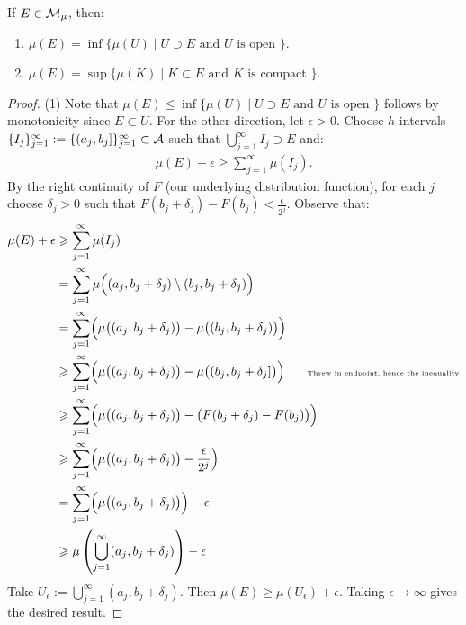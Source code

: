     \begin{theorem}\label{thm:measurable-sets-prop}
        If $E \in \mathcal{M}_\mu$, then:
        \begin{enumerate}[label = (\arabic*),itemsep=1pt,topsep=3pt]
            \item $\mu(E) = \inf\{\mu(U) \mid U \supset E \text{ and }U \text{ is open }\} $.
            \item $\mu(E) = \sup\{\mu(K) \mid K \subset E \text{ and }K \text{ is compact }\}$.
        \end{enumerate}
    \end{theorem}
        \begin{proof}
            (1) Note that $\mu(E) \leq \inf \{\mu(U) \mid U \supset E \text{ and }U \text{ is open }\}$ follows by monotonicity since $E \subset U$. For the other direction, let $\epsilon > 0$. Choose $h$-intervals $\{I_j\}_{j = 1}^\infty := \{(a_j,b_j]\}_{j = 1}^\infty \subset \mathcal{A}$ such that $\bigcup_{j = 1}^\infty I_j \supset E$ and:
                \begin{equation*}
                \begin{split}
                    \mu(E) + \epsilon \geq \sum_{j = 1}^\infty \mu(I_j).
                \end{split}
                \end{equation*}
            By the right continuity of $F$ (our underlying distribution function), for each $j$ choose $\delta_j > 0$ such that $F(b_j + \delta_j) - F(b_j) < \frac{\epsilon}{2^j}$. Observe that:
                \begin{equation*}
                \begin{split}
                    \mu(E) + \epsilon 
                    & \geq \sum_{j = 1}^\infty \mu(I_j) \\
                    & = \sum_{j = 1}^\infty \mu \Bigl((a_j,b_j + \delta_j) \setminus (b_j, b_j + \delta_j)\Bigr) \\
                    & = \sum_{j=1}^\infty \Bigl(\mu\bigl((a_j, b_j + \delta_j)\bigr) - \mu\bigl((b_j, b_j + \delta_j)\bigr)\Bigr) \\
                    & \geq \sum_{j=1}^\infty \Bigl(\mu\bigl((a_j, b_j + \delta_j)\bigr) - \mu\bigl((b_j, b_j + \delta_j]\bigr)\Bigr) \h9\h9\text{\tiny Threw in endpoint, hence the inequality} \\
                    & \geq \sum_{j=1}^\infty \Bigl(\mu\bigl((a_j, b_j + \delta_j)\bigr) - \bigl(F(b_j + \delta_j) - F(b_j)\bigr)\Bigr) \\
                    & \geq \sum_{j=1}^\infty \Bigl(\mu\bigl((a_j, b_j + \delta_j)\bigr) - \frac{\epsilon}{2^j}\Bigr) \\
                    & = \sum_{j=1}^\infty \Bigl(\mu\bigl((a_j, b_j + \delta_j)\bigr)\Bigr) - \epsilon \\
                    & \geq \mu \left( \bigcup_{j = 1}^\infty (a_j,b_j + \delta_j) \right) - \epsilon
                \end{split}
                \end{equation*}
            Take $U_\epsilon := \bigcup_{j = 1}^\infty (a_j,b_j + \delta_j)$. Then $\mu(E) \geq \mu(U_\epsilon) + \epsilon$. Taking $\epsilon \rightarrow \infty$ gives the desired result.


\end{proof}

